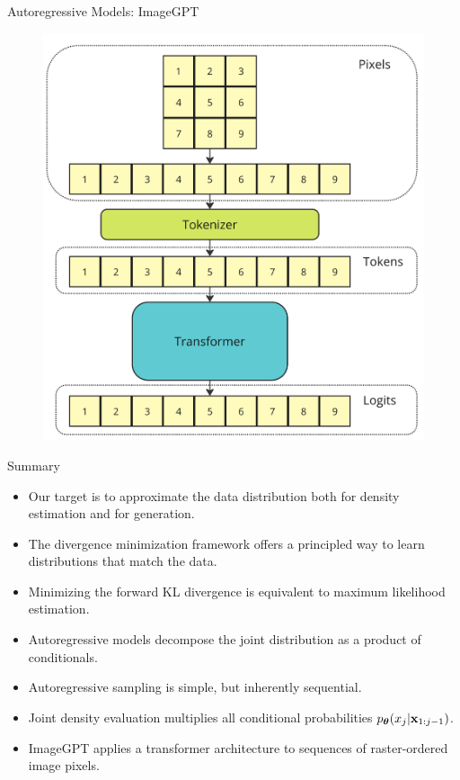\documentclass{beamer}
\begin{document}
\begin{frame}{Autoregressive Models: ImageGPT}
	\begin{figure}
		\centering
  			\includegraphics[width=0.65\linewidth]{figs/imagegpt.png}
	\end{figure}
\end{frame}
\begin{frame}{Summary}
    \begin{itemize}
    	\item Our target is to approximate the data distribution both for density estimation and for generation.
    	\vfill
    	\item The divergence minimization framework offers a principled way to learn distributions that match the data.
    	\vfill
    	\item Minimizing the forward KL divergence is equivalent to maximum likelihood estimation.
    	\vfill
    	\item Autoregressive models decompose the joint distribution as a product of conditionals.
    	\vfill
        \item Autoregressive sampling is simple, but inherently sequential.
        \vfill
        \item Joint density evaluation multiplies all conditional probabilities $p_{\boldsymbol{\theta}}(x_j | \mathbf{x}_{1:j - 1})$.
        \vfill
     	\item ImageGPT applies a transformer architecture to sequences of raster-ordered image pixels.
    \end{itemize}
\end{frame}
\end{document}
